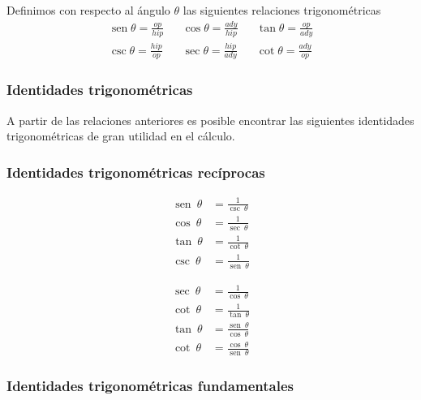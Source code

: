 \documentclass[11pt,letterpaper,oneside]{book}
\numberwithin{equation}{section}
\renewcommand{\sin}{\operatorname{sen}}
\begin{document}
	
	\begin{definición}
		Definimos con respecto al ángulo $\theta$ las siguientes relaciones trigonométricas
		\begin{align*}
			\operatorname{sen}\theta = \frac{op}{hip} && \operatorname{cos}\theta = \frac{ady}{hip} && \operatorname{tan}\theta = \frac{op}{ady} \\
			\operatorname{csc}\theta = \frac{hip}{op} && \operatorname{sec}\theta = \frac{hip}{ady} && \operatorname{cot}\theta = \frac{ady}{op}
		\end{align*}
	\end{definición}

	\subsubsection{Identidades trigonométricas}
	
	\par A partir de las relaciones anteriores es posible encontrar las siguientes identidades trigonométricas de gran utilidad en el cálculo.
	
	\subsubsection{Identidades trigonométricas recíprocas}
	
	\begin{minipage}{0.48\textwidth}
		\begin{align}
			\sin\ \theta &= \frac{1}{\csc \ \theta} \\
			\cos\ \theta &= \frac{1}{\sec\ \theta} \\
			\tan\ \theta &= \frac{1}{\cot\ \theta} \\
			\csc \ \theta &= \frac{1}{\operatorname{sen}\ \theta}
		\end{align}
	\end{minipage}
	\begin{minipage}{0.48\textwidth}
		\begin{align}
			\sec\ \theta &= \frac{1}{\cos\ \theta} \\
			\cot\ \theta &= \frac{1}{\tan \ \theta} \\
			\tan\ \theta &= \frac{\sin\ \theta}{\cos\ \theta} \\
			\cot\ \theta &= \frac{\cos\ \theta}{\sin\ \theta}
		\end{align}
	\end{minipage}
	
	\subsubsection{Identidades trigonométricas fundamentales}
	
\end{document}
